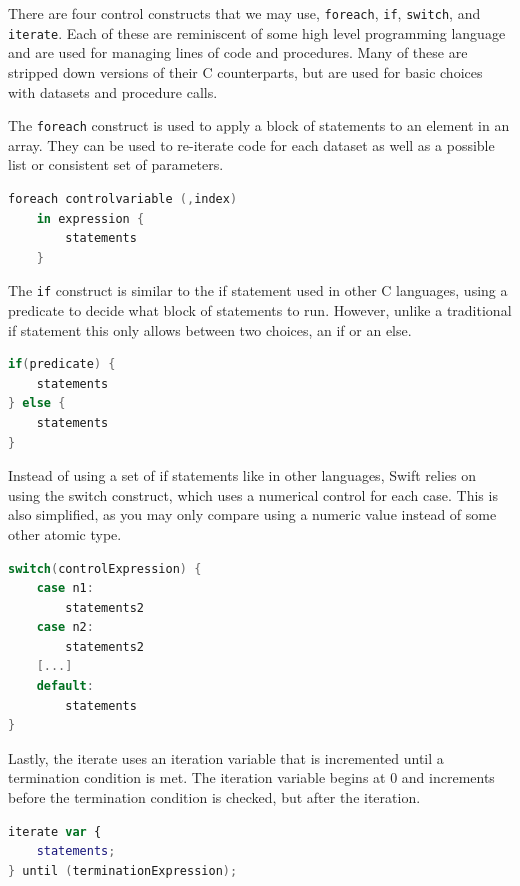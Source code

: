         There are four control constructs that we may use, \texttt{foreach}, \texttt{if}, \texttt{switch}, and \texttt{iterate}. Each of these are reminiscent of some high level programming language and are used for managing lines of code and procedures. Many of these are stripped down versions of their C counterparts, but are used for basic choices with datasets and procedure calls.

        The \texttt{foreach} construct is used to apply a block of statements to an element in an array. They can be used to re-iterate code for each dataset as well as a possible list or consistent set of parameters.

        \begin{lstlisting}[language=swift]
foreach controlvariable (,index)
    in expression {
        statements
    }
        \end{lstlisting}

        The \texttt{if} construct is similar to the if statement used in other C languages, using a predicate to decide what block of statements to run. However, unlike a traditional if statement this only allows between two choices, an if or an else.

        \begin{lstlisting}[language=swift]
if(predicate) {
    statements
} else {
    statements
}
        \end{lstlisting}

        Instead of using a set of if statements like in other languages, Swift relies on using the switch construct, which uses a numerical control for each case. This is also simplified, as you may only compare using a numeric value instead of some other atomic type.

        \begin{lstlisting}[language=swift]
switch(controlExpression) {
    case n1:
        statements2
    case n2:
        statements2
    [...]
    default:
        statements
}
        \end{lstlisting}

        Lastly, the iterate uses an iteration variable that is incremented until a termination condition is met. The iteration variable begins at 0 and increments before the termination condition is checked, but after the iteration.

        \begin{lstlisting}[language=swift]
iterate var {
    statements;
} until (terminationExpression);
        \end{lstlisting}

